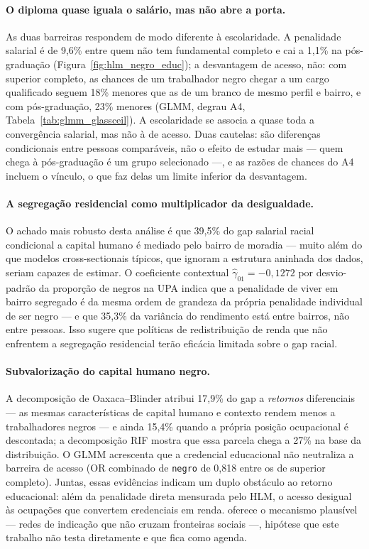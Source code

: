 \documentclass[12pt, a4paper, oneside]{article}
\begin{document}
\paragraph{O diploma quase iguala o salário, mas não abre a porta.}
As duas barreiras respondem de modo diferente à escolaridade. A penalidade salarial é de 9{,}6\% entre quem não tem fundamental completo e cai a 1{,}1\% na pós-graduação (Figura~\ref{fig:hlm_negro_educ}); a desvantagem de acesso, não: com superior completo, as chances de um trabalhador negro chegar a um cargo qualificado seguem 18\% menores que as de um branco de mesmo perfil e bairro, e com pós-graduação, 23\% menores (GLMM, degrau A4, Tabela~\ref{tab:glmm_glassceil}). A escolaridade se associa a quase toda a convergência salarial, mas não à de acesso. Duas cautelas: são diferenças condicionais entre pessoas comparáveis, não o efeito de estudar mais --- quem chega à pós-graduação é um grupo selecionado ---, e as razões de chances do A4 incluem o vínculo, o que faz delas um limite inferior da desvantagem.

\paragraph{A segregação residencial como multiplicador da desigualdade.}
O achado mais robusto desta análise é que 39,5\% do gap salarial racial
condicional a capital humano é mediado pelo bairro de moradia --- muito além do que modelos
cross-sectionais típicos, que ignoram a estrutura aninhada dos dados,
seriam capazes de estimar. O coeficiente contextual
$\hat{\gamma}_{01} = −0,1272$ por desvio-padrão da proporção de negros na UPA
indica que a penalidade de viver em bairro segregado é da mesma ordem
de grandeza da própria penalidade individual de ser negro --- e que 35,3\%
da variância do rendimento está entre bairros, não entre pessoas.
Isso sugere que políticas de redistribuição de renda que não enfrentem
a segregação residencial terão eficácia limitada sobre o gap racial.

\paragraph{Subvalorização do capital humano negro.}
A decomposição de Oaxaca--Blinder atribui 17,9\% do gap a \textit{retornos}
diferenciais --- as mesmas características de capital humano e contexto rendem
menos a trabalhadores negros --- e ainda 15,4\% quando a própria posição
ocupacional é descontada; a decomposição RIF mostra que essa parcela chega a 27\%
na base da distribuição. O GLMM acrescenta que a
credencial educacional não neutraliza a barreira de acesso (OR combinado de
\texttt{negro} de 0,818 entre os de superior completo). Juntas, essas evidências indicam
um duplo obstáculo ao retorno educacional: além da penalidade direta mensurada
pelo HLM, o acesso desigual às ocupações que convertem credenciais em renda.
 oferece o mecanismo plausível --- redes de indicação
que não cruzam fronteiras sociais ---, hipótese que este trabalho não testa
diretamente e que fica como agenda.
\end{document}

